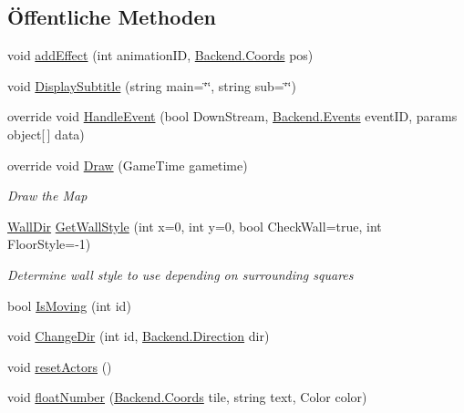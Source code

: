 \subsection*{Öffentliche Methoden}
\begin{DoxyCompactItemize}
\item 
void \hyperlink{class_gruppe22_1_1_client_1_1_mainmap_a9936914d9373c75eff572c9b2442a305}{add\-Effect} (int animation\-I\-D, \hyperlink{class_gruppe22_1_1_backend_1_1_coords}{Backend.\-Coords} pos)
\item 
void \hyperlink{class_gruppe22_1_1_client_1_1_mainmap_aca5456f7739a950a12c1c64c829d574d}{Display\-Subtitle} (string main=\char`\"{}\char`\"{}, string sub=\char`\"{}\char`\"{})
\item 
override void \hyperlink{class_gruppe22_1_1_client_1_1_mainmap_adaff683f9444d9fa87c22b51886da78a}{Handle\-Event} (bool Down\-Stream, \hyperlink{namespace_gruppe22_1_1_backend_ab56df91bb0bdafa1ea978e552209ce73}{Backend.\-Events} event\-I\-D, params object\mbox{[}$\,$\mbox{]} data)
\item 
override void \hyperlink{class_gruppe22_1_1_client_1_1_mainmap_a23697dc218e8c4a44feef0f92fa3faf6}{Draw} (Game\-Time gametime)
\begin{DoxyCompactList}\small\item\em Draw the Map \end{DoxyCompactList}\item 
\hyperlink{namespace_gruppe22_1_1_client_aa675883495b38ce0697938ab6300d990}{Wall\-Dir} \hyperlink{class_gruppe22_1_1_client_1_1_mainmap_ac62bde943b1752a7612a8f8030f76088}{Get\-Wall\-Style} (int x=0, int y=0, bool Check\-Wall=true, int Floor\-Style=-\/1)
\begin{DoxyCompactList}\small\item\em Determine wall style to use depending on surrounding squares \end{DoxyCompactList}\item 
bool \hyperlink{class_gruppe22_1_1_client_1_1_mainmap_a93e6f2920cbad8f0add8ac161f17fc7e}{Is\-Moving} (int id)
\item 
void \hyperlink{class_gruppe22_1_1_client_1_1_mainmap_af8ba0ebfcfdb304a2eb3d308839d4a05}{Change\-Dir} (int id, \hyperlink{namespace_gruppe22_1_1_backend_a2d53d5d14b8ea0951ba6971e5da1ebf5}{Backend.\-Direction} dir)
\item 
void \hyperlink{class_gruppe22_1_1_client_1_1_mainmap_a505cd7b8e7a9b55d2e0816b4f52477a3}{reset\-Actors} ()
\item 
void \hyperlink{class_gruppe22_1_1_client_1_1_mainmap_a36fce64e823ffd422e3851c290f0fe87}{float\-Number} (\hyperlink{class_gruppe22_1_1_backend_1_1_coords}{Backend.\-Coords} tile, string text, Color color)

\end{DoxyCompactItemize}
